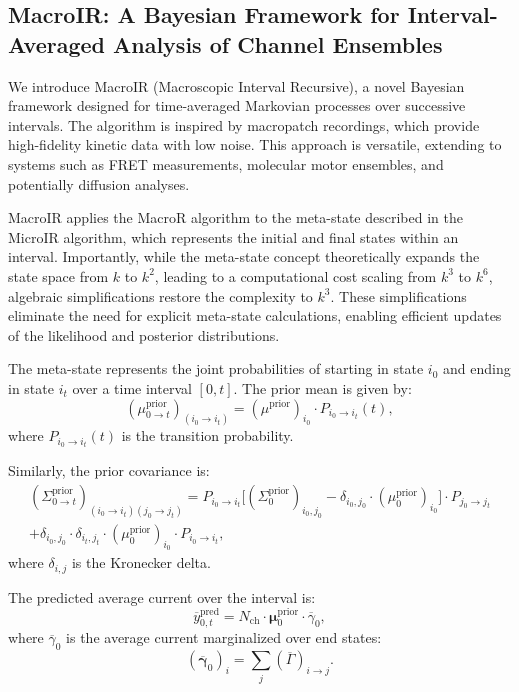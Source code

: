 \documentclass[pdflatex,sn-mathphys-num]{sn-jnl}%
\theoremstyle{thmstyleone}%
\theoremstyle{thmstyletwo}%
\theoremstyle{thmstylethree}%
\begin{document}
\subsection{MacroIR: A Bayesian Framework for Interval-Averaged Analysis of Channel Ensembles}

We introduce MacroIR (Macroscopic Interval Recursive), a novel Bayesian framework designed for time-averaged Markovian processes over successive intervals. The algorithm is inspired by macropatch recordings, which provide high-fidelity kinetic data with low noise. This approach is versatile, extending to systems such as FRET measurements, molecular motor ensembles, and potentially diffusion analyses.

MacroIR applies the MacroR algorithm to the meta-state described in the MicroIR algorithm, which represents the initial and final states within an interval. Importantly, while the meta-state concept theoretically expands the state space from \( k \) to \( k^2 \), leading to a computational cost scaling from \( k^3 \) to \( k^6 \), algebraic simplifications restore the complexity to \( k^3 \). These simplifications eliminate the need for explicit meta-state calculations, enabling efficient updates of the likelihood and posterior distributions.

The meta-state represents the joint probabilities of starting in state \( i_0 \) and ending in state \( i_t \) over a time interval \( [0, t] \). The prior mean is given by:
\begin{equation}
	(\mu^{\text{prior}}_{0 \rightarrow t})_{(i_0 \rightarrow i_t)} = (\mu^{\text{prior}})_{i_0} \cdot P_{i_0 \rightarrow i_t}(t),
	\label{eq:meta_mean_prior}
\end{equation}
where \( P_{i_0 \rightarrow i_t}(t) \) is the transition probability.

Similarly, the prior covariance is:
\begin{multline}
	(\Sigma^{\text{prior}}_{0 \rightarrow t})_{(i_0 \rightarrow i_t)(j_0 \rightarrow j_t)} = 
	P_{i_0 \rightarrow i_t} \big[(\Sigma^{\text{prior}}_0)_{i_0, j_0} - \delta_{i_0, j_0} \cdot (\mu^{\text{prior}}_0)_{i_0} \big] \cdot P_{j_0 \rightarrow j_t} \\
	+ \delta_{i_0, j_0} \cdot \delta_{i_t, j_t} \cdot (\mu^{\text{prior}}_0)_{i_0} \cdot P_{i_0 \rightarrow i_t},
	\label{eq:meta_covariance_prior}
\end{multline}
where \( \delta_{i, j} \) is the Kronecker delta.

The predicted average current over the interval is:
\begin{equation}
	\overline{y}^{\text{pred}}_{0,t} = N_{\text{ch}} \cdot \mathbf{\mu}^{\text{prior}}_{0} \cdot \overline{\gamma}_{0},
	\label{eq:macro_interval_predicted_y}
\end{equation}
where \( \overline{\gamma}_{0} \) is the average current marginalized over end states:
\begin{equation}
	(\overline{\mathbf{\gamma}}_{0})_i = \sum_j (\overline{\Gamma})_{i \rightarrow j}.
\end{equation}
\end{document}
